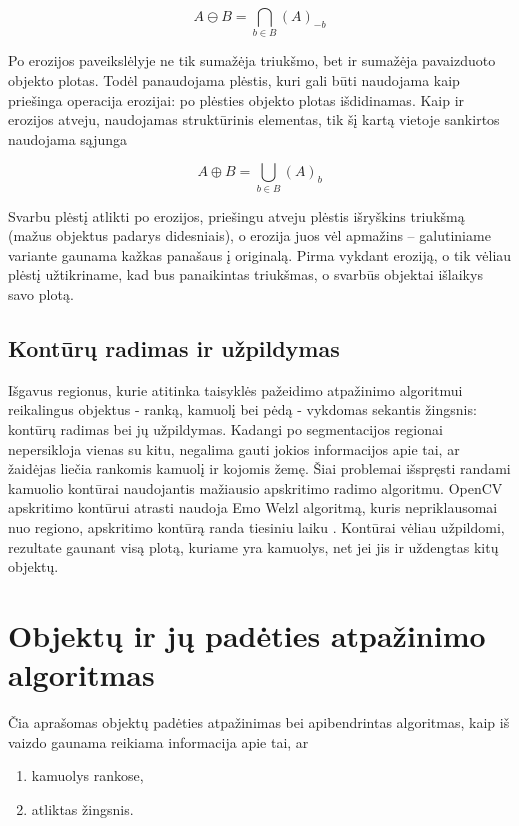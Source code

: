 \documentclass{VUMIFPSkursinis}
\begin{document}
\begin{equation}\label{eq:erozija}
A \ominus B = \bigcap_ {b \in B } (A)_{-b} 
\end{equation}

Po erozijos paveikslėlyje ne tik sumažėja triukšmo, bet ir sumažėja pavaizduoto objekto plotas. Todėl panaudojama plėstis, kuri gali būti naudojama kaip priešinga operacija erozijai: po plėsties objekto plotas išdidinamas. Kaip ir erozijos atveju, naudojamas struktūrinis elementas, tik šį kartą vietoje sankirtos naudojama sąjunga \cite{ImageAnalysisMorph}

\begin{equation}\label{eq:plestis}
A \oplus B = \bigcup_ {b \in B } (A)_{b} 
\end{equation}

Svarbu plėstį atlikti po erozijos, priešingu atveju plėstis išryškins triukšmą (mažus objektus padarys didesniais), o erozija juos vėl apmažins – galutiniame variante gaunama kažkas panašaus į originalą. Pirma vykdant eroziją, o tik vėliau plėstį užtikriname, kad bus panaikintas triukšmas, o svarbūs objektai išlaikys savo plotą. 

\subsection{Kontūrų radimas ir užpildymas}
Išgavus regionus, kurie atitinka taisyklės pažeidimo atpažinimo algoritmui reikalingus objektus - ranką, kamuolį bei pėdą - vykdomas sekantis žingsnis: kontūrų radimas bei jų užpildymas. Kadangi po segmentacijos regionai nepersikloja vienas su kitu, negalima gauti jokios informacijos apie tai, ar žaidėjas liečia rankomis kamuolį ir kojomis žemę. Šiai problemai išspręsti randami kamuolio kontūrai naudojantis mažiausio apskritimo radimo algoritmu. OpenCV apskritimo kontūrui atrasti naudoja Emo Welzl algoritmą, kuris nepriklausomai nuo regiono, apskritimo kontūrą randa tiesiniu laiku \cite{smallestenclosing}. Kontūrai vėliau užpildomi, rezultate gaunant visą plotą, kuriame yra kamuolys, net jei jis ir uždengtas kitų objektų.

\section{Objektų ir jų padėties atpažinimo algoritmas}
Čia aprašomas objektų padėties atpažinimas bei apibendrintas algoritmas, kaip iš vaizdo gaunama reikiama informacija apie tai, ar 
\begin{enumerate}
	\item kamuolys rankose, 
	\item atliktas žingsnis.
\end{enumerate}
\end{document}
